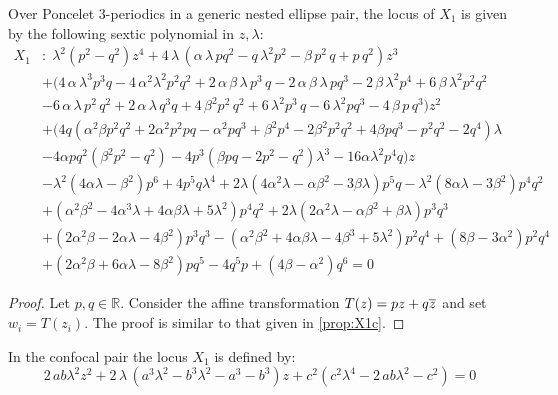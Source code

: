 \begin{proposition}
\label{prop:X1g}
Over Poncelet 3-periodics in a generic nested ellipse pair, the locus of $X_1$ is given by the following sextic polynomial in $z,\lambda$:
{\small
\begin{align*}
X_1&: \;{\lambda}^{2} \left( p^2-q^2 \right) {
z}^{4}+4\,\lambda\, \left( \alpha\,\lambda\,p q^2  - q\,{
\lambda}^{2}p^{2}-\beta\,p^2\,q+p\,q^{2} \right) {z}^{3}\\
&+  ( 4\,\alpha\,{
\lambda}^{3}p^{3} q-4\,{\alpha}^{2}{\lambda}^{2}p^{2}q^2 +2\,\alpha\,\beta\,\lambda\,p^{3}
\,q-2\,\alpha\,\beta\,\lambda\,pq^{3} -2\,\beta\,{\lambda}^{2
}p^{4}+6\,\beta\,{\lambda}^{2}p^{2}q^2\\
&-6\,\alpha\,
\lambda\,p^2\,q^{2}+2\,\alpha\,\lambda\,q^{3} q+4\,{
\beta}^{2}p^2\,q^{2}  
  +6\,{\lambda}^{2}p^{3} \,q
 -6\,{
\lambda}^{2} p q^{3}  -4\,\beta\,p\,q^{3}  ) {z}^{
2}\\
&+ ( 4 q (\alpha^2\beta p^2 q^2 + 2\alpha^2 p^2  p q - \alpha^2 p q^3 + \beta^2 p^4 - 2\beta^2 p^2 q^2+ 4\beta p q^3 - p^2 q^2 - 2 q^4)\lambda \\
&- 4\alpha  p q^2 (\beta^2 p^2 - q^2) - 4 p^3 (\beta p  q - 2 p^2 - q^2)\lambda^3 - 16\alpha\lambda^2 p^4   q ) z\\
   & -\lambda^2 (4 \alpha \lambda - \beta^2) p^6 + 4 p^5 q \lambda^4 + 2 \lambda (4 \alpha^2 \lambda - \alpha \beta^2 - 3 \beta \lambda) p^5 q   - \lambda^2 (8 \alpha \lambda - 3 \beta^2) p^4 q^2 \\
   &+ (\alpha^2 \beta^2 -4 \alpha^3 \lambda  + 4 \alpha \beta \lambda + 5 \lambda^2) p^4 q^2 + 2 \lambda (2 \alpha^2 \lambda - \alpha \beta^2 + \beta \lambda) p^3 q^3 \\
   &+ (2 \alpha^2 \beta - 2 \alpha \lambda - 4 \beta^2) p^3 q^3 - (\alpha^2 \beta^2 + 4 \alpha \beta \lambda - 4 \beta^3 + 5 \lambda^2) p^2 q^4 + ( 8 \beta-3 \alpha^2 ) p^2 q^4 \\
   &+ (2 \alpha^2 \beta + 6 \alpha \lambda - 8 \beta^2) p q^5 - 4 q^5 p + ( 4 \beta-\alpha^2 ) q^6=0
\end{align*}
}
\end{proposition}

\begin{proof} Let $p,q\in \mathbb{R}$. Consider the affine transformation
$T(z)=pz+q\overline z$ and set $w_i=T(z_i)$. The proof is similar to that given in \cref{prop:X1c}.  
\end{proof}

\begin{proposition} In the confocal pair the locus $X_1$ is defined by:
\[2\,ab{\lambda}^{2}{z}^{2}+2\,\lambda\, \left( {a}^{3}{\lambda}^{2}-{b}
^{3}{\lambda}^{2}-{a}^{3}-{b}^{3} \right) z+{c}^{2} \left( {c}^{2}{
\lambda}^{4}-2\,ab{\lambda}^{2}-{c}^{2} \right)=0 \]
\label{prop:X1q2} 
\end{proposition}

